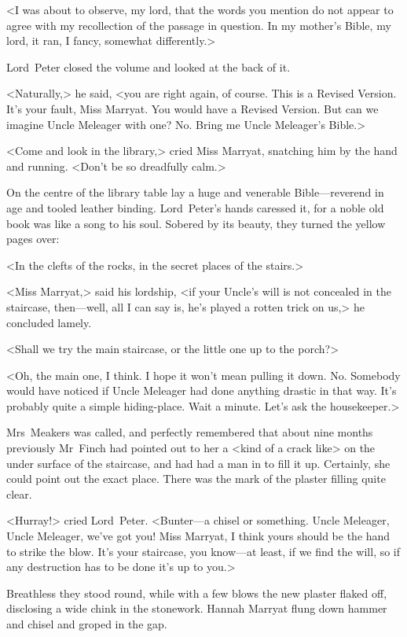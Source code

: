 <I was about to observe, my lord, that the words you mention do not appear to agree with my recollection of the passage in question. In my mother's Bible, my lord, it ran, I fancy, somewhat differently.>

Lord~Peter closed the volume and looked at the back of it.

<Naturally,> he said, <you are right again, of course. This is a Revised Version. It's your fault, Miss Marryat. You would have a Revised Version. But can we imagine Uncle Meleager with one? No. Bring me Uncle Meleager's Bible.>

<Come and look in the library,> cried Miss Marryat, snatching him by the hand and running. <Don't be so dreadfully calm.>

On the centre of the library table lay a huge and venerable Bible—reverend in age and tooled leather binding. Lord~Peter's hands caressed it, for a noble old book was like a song to his soul. Sobered by its beauty, they turned the yellow pages over:

<In the clefts of the rocks, in the secret places of the stairs.>

<Miss Marryat,> said his lordship, <if your Uncle's will is not concealed in the staircase, then—well, all I can say is, he's played a rotten trick on us,> he concluded lamely.

<Shall we try the main staircase, or the little one up to the porch?>

<Oh, the main one, I think. I hope it won't mean pulling it down. No. Somebody would have noticed if Uncle Meleager had done anything drastic in that way. It's probably quite a simple hiding-place. Wait a minute. Let's ask the housekeeper.>

Mrs~Meakers was called, and perfectly remembered that about nine months previously Mr~Finch had pointed out to her a <kind of a crack like> on the under surface of the staircase, and had had a man in to fill it up. Certainly, she could point out the exact place. There was the mark of the plaster filling quite clear.

<Hurray!> cried Lord~Peter. <Bunter—a chisel or something. Uncle Meleager, Uncle Meleager, we've got you! Miss Marryat, I think yours should be the hand to strike the blow. It's your staircase, you know—at least, if we find the will, so if any destruction has to be done it's up to you.>

Breathless they stood round, while with a few blows the new plaster flaked off, disclosing a wide chink in the stonework. Hannah Marryat flung down hammer and chisel and groped in the gap.

